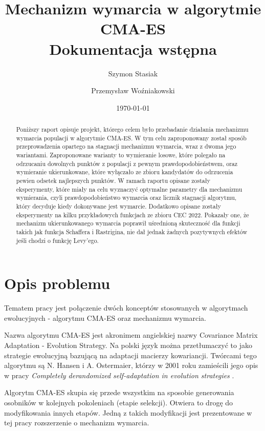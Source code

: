 \documentclass[10pt]{article}
\title{Mechanizm wymarcia w algorytmie CMA-ES \\
\large Dokumentacja wstępna}
\author{Szymon Stasiak \and Przemysław Woźniakowski}
\date{\today}
\begin{document}
\maketitle

\begin{abstract}
    Poniższy raport opisuje projekt, którego celem było przebadanie działania mechanizmu wymarcia populacji w algorytmie CMA-ES. W tym celu zaproponowany został sposób przeprowadzenia opartego na stagnacji mechanizmu wymarcia, wraz z dwoma jego wariantami. Zaproponowane warianty to wymieranie losowe, które polegało na odrzucaniu dowolnych punktów z populacji z pewnym prawdopodobieństwem, oraz wymieranie ukierunkowane, które wyłączało ze zbioru kandydatów do odrzucenia pewien odsetek najlepszych punktów. W ramach raportu opisane zostały eksperymenty, które miały na celu wyznaczyć optymalne parametry dla mechanizmu wymierania, czyli prawdopodobieństwo wymarcia oraz licznik stagnacji algorytmu, który decyduje kiedy dokonywane jest wymarcie. Dodatkowo opisane zostały eksperymenty na kilku przykładowych funkcjach  ze zbioru CEC 2022. Pokazały one, że mechanizm ukierunkowanego wymarcia poprawił uśrednioną skuteczność dla funkcji takich jak funkcja Schaffera i Rastrigina, nie dał jednak żadnych pozytywnych efektów jeśli chodzi o funkcję Levy'ego.
\end{abstract}

\tableofcontents

\newpage

\section{Opis problemu}

Tematem pracy jest połączenie dwóch konceptów stosowanych w algorytmach ewolucyjnych - algorytmu CMA-ES oraz mechanizmu wymarcia.

Nazwa algorytmu CMA-ES jest akronimem angielskiej nazwy Covariance Matrix Adaptation - Evolution Strategy. Na polski język można przetłumaczyć to jako strategie ewolucyjną bazującą na adaptacji macierzy kowariancji. Twórcami tego algorytmu są N. Hansen i A. Ostermaier, którzy w 2001 roku zamieścili jego opis w pracy \textit{Completely derandomized self-adaptation in evolution strategies} \cite{hansen2011}.

Algorytm CMA-ES skupia się przede wszystkim na sposobie generowania osobników w kolejnych pokoleniach (etapie selekcji). Otwiera to drogę do modyfikowania innych etapów. Jedną z takich modyfikacji jest prezentowane w tej pracy rozszerzenie o mechanizm wymarcia.
\end{document}
